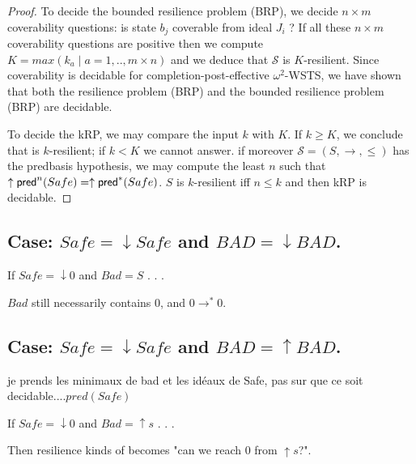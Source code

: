 \begin{proof}
%

To decide the %
 bounded resilience problem (BRP), we decide $n \times m$ coverability questions: is state $b_j$ coverable from ideal $J_i$ ? If all these $n \times m$ coverability questions are positive then we compute $K=max(k_a \mid a=1,..,m \times n)$ and we deduce that  $\mathscr{S}$ is %
  $K$-resilient. Since coverability is decidable for completion-post-effective $\omega^2$-WSTS, we have shown that both the %
  resilience problem (BRP) and the %
  bounded resilience problem (BRP) are decidable.

To decide the kRP, we may compare the input $k$ with $K$. If $k \geq K$, we conclude that is %
$k$-resilient; if $k < K$ we cannot answer. if moreover $\mathscr{S}=(S,\rightarrow, \leq)$ has the predbasis hypothesis, we may compute the least $n$ such that $ \uparrow \textsf{pred}^n(Safe)=  \uparrow \textsf{pred}^*(Safe)$. $S$ is %
 $k$-resilient iff $n \leq k$ and then kRP is decidable.
\end{proof}

%




\subsection{Case: $Safe=\downarrow Safe$ and $BAD=\downarrow BAD$.}

If $Safe = \downarrow 0$ and $Bad = S$ . . . 

$Bad$ still necessarily contains $0$, and $0 \rightarrow^* 0$.

\subsection{Case: $Safe=\downarrow Safe$ and $BAD=\uparrow BAD$.}
%
%
je prends les minimaux de bad et les idéaux de Safe, pas sur que ce soit decidable....$pred(Safe)$


If $Safe = \downarrow 0$ and $Bad = \uparrow s$ . . . 

Then resilience kinds of becomes "can we reach $0$ from $\uparrow s$?".

